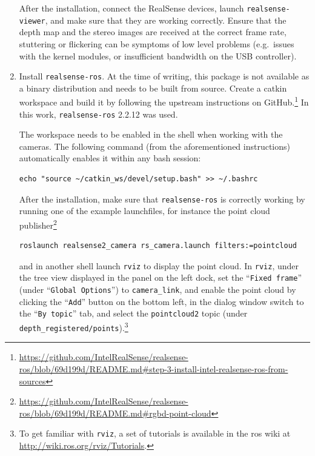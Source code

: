 \documentclass[11pt, letterpaper, twoside]{article}
\begin{document}
\begin{enumerate}
        After the installation, connect the RealSense devices, launch
        \texttt{realsense-viewer}, and make sure that they are working
        correctly. Ensure that the depth map and the stereo images are received
        at the correct frame rate, stuttering or flickering can be symptoms of
        low level problems (e.g.\ issues with the kernel modules, or
        insufficient bandwidth on the USB controller).

    \item Install \texttt{realsense-ros}. At the time of writing, this package
        is not available as a binary distribution and needs to be built from
        source. Create a catkin workspace and build it by following the
        upstream instructions on
        GitHub.\footnote{\url{https://github.com/IntelRealSense/realsense-ros/blob/69d199d/README.md\#step-3-install-intel-realsense-ros-from-sources}}
        In this work, \texttt{realsense-ros} 2.2.12 was used.

        The workspace needs to be enabled in the shell when working with the
        cameras. The following command (from the aforementioned instructions)
        automatically enables it within any bash session:
\begin{Verbatim}[samepage=true]
    echo "source ~/catkin_ws/devel/setup.bash" >> ~/.bashrc
\end{Verbatim}
        After the installation, make sure that \texttt{realsense-ros} is
        correctly working by running one of the example launchfiles, for
        instance the point cloud publisher\footnote{\url{https://github.com/IntelRealSense/realsense-ros/blob/69d199d/README.md\#rgbd-point-cloud}}
\begin{Verbatim}[samepage=true]
    roslaunch realsense2_camera rs_camera.launch filters:=pointcloud
\end{Verbatim}
        and in another shell launch \texttt{rviz} to display the point cloud.
        In \texttt{rviz}, under the tree view displayed in the panel on the
        left dock, set the ``\texttt{Fixed frame}'' (under ``\texttt{Global
        Options}'') to \texttt{camera\_link}, and enable the point cloud by
        clicking the ``\texttt{Add}'' button on the bottom left, in the dialog
        window switch to the ``\texttt{By topic}'' tab, and select the
        \texttt{pointcloud2} topic (under
        \texttt{depth\_registered/points}).\footnote{To get familiar with
        \texttt{rviz}, a set of tutorials is available in the \gls{ros} wiki at
        \url{http://wiki.ros.org/rviz/Tutorials}.}


\end{enumerate}
\end{document}
